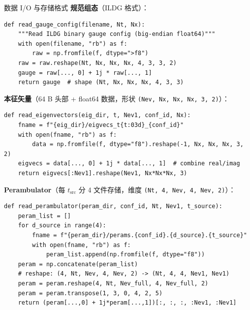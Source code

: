 \documentclass[10pt,aspectratio=169]{beamer}
\begin{document}
\begin{frame}[fragile]{数据 I/O 与存储格式}
\small
\textbf{规范组态}（ILDG 格式）：
\begin{lstlisting}
def read_gauge_config(filename, Nt, Nx):
    """Read ILDG binary gauge config (big-endian float64)"""
    with open(filename, "rb") as f:
        raw = np.fromfile(f, dtype=">f8")
    raw = raw.reshape(Nt, Nx, Nx, Nx, 4, 3, 3, 2)
    gauge = raw[..., 0] + 1j * raw[..., 1]
    return gauge  # shape (Nt, Nx, Nx, Nx, 4, 3, 3)
\end{lstlisting}

\textbf{本征矢量}（64 B 头部 + float64 数据，形状 \texttt{(Nev, Nx, Nx, Nx, 3, 2)}）：
\begin{lstlisting}
def read_eigenvectors(eig_dir, t, Nev1, conf_id, Nx):
    fname = f"{eig_dir}/eigvecs_t{t:03d}_{conf_id}"
    with open(fname, "rb") as f:
        data = np.fromfile(f, dtype="f8").reshape(-1, Nx, Nx, Nx, 3, 2)
    eigvecs = data[..., 0] + 1j * data[..., 1]  # combine real/imag
    return eigvecs[:Nev1].reshape(Nev1, Nx*Nx*Nx, 3)
\end{lstlisting}

\textbf{Perambulator}（每 $t_{\text{src}}$ 分 4 文件存储，维度 \texttt{(Nt, 4, Nev, 4, Nev, 2)}）：
\begin{lstlisting}
def read_perambulator(peram_dir, conf_id, Nt, Nev1, t_source):
    peram_list = []
    for d_source in range(4):
        fname = f"{peram_dir}/perams.{conf_id}.{d_source}.{t_source}"
        with open(fname, "rb") as f:
            peram_list.append(np.fromfile(f, dtype="f8"))
    peram = np.concatenate(peram_list)
    # reshape: (4, Nt, Nev, 4, Nev, 2) -> (Nt, 4, 4, Nev1, Nev1)
    peram = peram.reshape(4, Nt, Nev_full, 4, Nev_full, 2)
    peram = peram.transpose(1, 3, 0, 4, 2, 5)
    return (peram[...,0] + 1j*peram[...,1])[:, :, :, :Nev1, :Nev1]
\end{lstlisting}
\end{frame}
\end{document}
